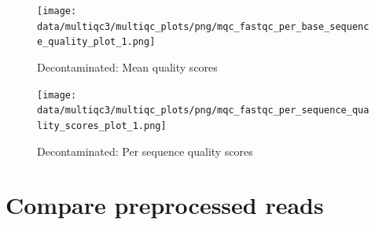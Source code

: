 \documentclass[
  12pt,
  openany]{book}
\begin{document}
\begin{figure}
\centering
\texttt{[image: data/multiqc3/multiqc\_plots/png/mqc\_fastqc\_per\_base\_sequence\_quality\_plot\_1.png]}
\caption{Decontaminated: Mean quality scores}
\end{figure}

\begin{figure}
\centering
\texttt{[image: data/multiqc3/multiqc\_plots/png/mqc\_fastqc\_per\_sequence\_quality\_scores\_plot\_1.png]}
\caption{Decontaminated: Per sequence quality scores}
\end{figure}

\hypertarget{compare-preprocessed-reads}{%
\section{Compare preprocessed reads}\label{compare-preprocessed-reads}}
\end{document}
